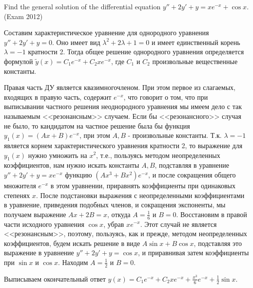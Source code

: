 


\begin{problem}
Find the general solution of the differential equation $y''+2y'+y=xe^{-x} +\cos x$. (Exam 2012)
\end{problem}

\begin{solution}
Составим характеристическое уравнение для однородного уравнения $y''+2y'+y=0$. Оно имеет вид $\lambda ^{2} +2\lambda +1=0$ и имеет единственный корень $\lambda =-1$ кратности 2. Тогда общее решение однородного уравнения определяется формулой $\tilde{y}(x)=C_{1} e^{-x} +C_{2} xe^{-x} $, где $C_{1} $ и $C_{2} $ произвольные вещественные константы.

Правая часть ДУ является квазимногочленом. При этом первое из слагаемых, входящих в правую часть, содержит $e^{-x} $, что говорит о том, что при выписывании частного решения неоднородного уравнения мы имеем дело с так называемым <<резонансным>> случаем. Если бы <<резонансного>> случая не было, то кандидатом на частное решение была бы функция $y_{1} (x)=(Ax+B)e^{-x} $, при этом $A, B$ - произвольные константы. Т.к. $\lambda =-1$ является корнем характеристического уравнения кратности 2, то выражение для $y_{1} (x)$ нужно умножить на $x^{2} $, т.е., пользуясь методом неопределенных коэффициентов, нам нужно искать константы $A, B$, подставляя в уравнение $y''+2y'+y=xe^{-x} $ функцию $(Ax^{3} +Bx^{2} )e^{-x} $, и после сокращения общего множителя $e^{-x} $ в этом уравнении, приравнять коэффициенты при одинаковых степенях $x$. После подстановки выражения с неопределенными коэффициентами в уравнение, приведения подобных членов, и сокращения экспоненты, мы получаем выражение $Ax+2B=x$, откуда $A=\frac{1}{6} $ и $B=0$. Восстановим в правой части исходного уравнения $\cos x$, убрав $xe^{-x} $. Этот случай не является <<резонансным>>, поэтому, пользуясь, как и прежде, методом неопределенных коэффициентов, будем искать решение в виде $A\sin x+B\cos x$, подставляя это выражение в уравнение $y''+2y'+y=\cos x$, и приравнивая затем коэффициенты при $\sin x$ и $\cos x$. Находим $A=\frac{1}{2} $ и $B=0$.

Выписываем окончательный ответ $y(x)=C_{1} e^{-x} +C_{2} xe^{-x} +\frac{x^{3} }{6} e^{-x} +\frac{1}{2} \sin x$.
\end{solution}

